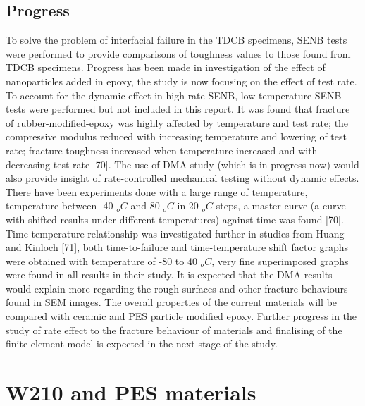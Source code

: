 \documentclass[numbers=noendperiod,chapterprefix=on]{icldt} %
\begin{document}
\subsection{Progress}
To solve the problem of interfacial failure in the TDCB specimens, SENB tests were performed to provide comparisons of toughness values to those found from TDCB specimens. Progress has been made in investigation of the effect of nanoparticles added in epoxy, the study is now focusing on the effect of test rate. 
To account for the dynamic effect in high rate SENB, low temperature SENB tests were performed but not included in this report. It was found that fracture of rubber-modified-epoxy was highly affected by temperature and test rate; the compressive modulus reduced with increasing temperature and lowering of test rate; fracture toughness increased when temperature increased and with decreasing test rate [70]. 
The use of DMA study (which is in progress now) would also provide insight of rate-controlled mechanical testing without dynamic effects. There have been experiments done with a large range of temperature, temperature between -40 $_oC$ and 80 $_oC$ in 20 $_oC$ steps, a master curve (a curve with shifted results under different temperatures) against time was found [70]. Time-temperature relationship was investigated further in studies from Huang and Kinloch [71], both time-to-failure and time-temperature shift factor graphs were obtained with temperature of -80 to 40 $_oC$, very fine superimposed graphs were found in all results in their study. It is expected that the DMA results would explain more regarding the rough surfaces and other fracture behaviours found in SEM images.
The overall properties of the current materials will be compared with ceramic and PES particle modified epoxy. Further progress in the study of rate effect to the fracture behaviour of materials and finalising of the finite element model is expected in the next stage of the study. 

\section{W210 and PES materials}
\end{document}

